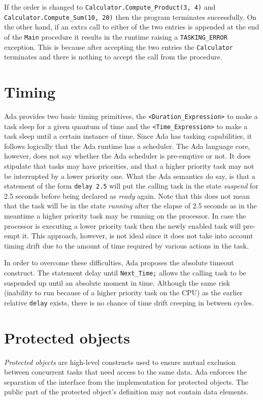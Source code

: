 If the order is changed to \texttt{Calculator.Compute\_Product(3, 4)}
and \texttt{Calculator.Compute\_Sum(10, 20)} then the program
terminates successfully. On the other hand, if an extra call to either
of the two entries is appended at the end of the \texttt{Main}
procedure it results in the runtime raising a \texttt{TASKING\_ERROR}
exception. This is because after accepting the two entries the
\texttt{Calculator} terminates and there is nothing to accept the call
from the procedure.

\section{Timing}
\label{ada_tasking_timing}
Ada provides two basic timing primitives, the 
\texttt{<Duration\_Expression>} to make a task sleep for a given
quantum of time and the  \texttt{<Time\_Expression>}
to make a task sleep until a certain instance of time. Since Ada has
tasking capabilities, it follows logically that the Ada runtime has a
scheduler. The Ada language core, however, does not say whether the
Ada scheduler is pre-emptive or not. It does stipulate that tasks may
have priorities, and that a higher priority task may not be
interrupted by a lower priority one. What the Ada semantics do say, is
that a statement of the form \texttt{delay 2.5} will put the calling
task in the state \emph{suspend} for 2.5 seconds before being declared
as \emph{ready} again. Note that this does not mean that the task will
be in the state \emph{running} after the elapse of 2.5 seconds as in
the meantime a higher priority task may be running on the
processor. In case the processor is executing a lower priority task
then the newly enabled task will pre-empt it. This approach, however,
is not ideal since it does not take into account timing drift due to
the amount of time required by various actions in the task.

In order to overcome these difficulties, Ada proposes the absolute
timeout construct. The statement {delay until} \texttt{Next\_Time;}
allows the calling task to be suspended up until an absolute moment in
time. Although the same risk (inability to run because of a higher
priority task on the CPU) as the earlier relative \texttt{delay}
exists, there is no chance of time drift creeping in between cycles.

\section{Protected objects}
\emph{Protected objects} are high-level constructs used to ensure
mutual exclusion between concurrent tasks that need access to the same
data. Ada enforces the separation of the interface from the
implementation for protected objects. The public part of the protected
object's definition may not contain data elements.

